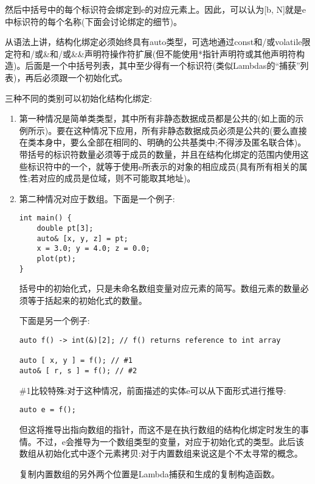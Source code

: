 然后中括号中的每个标识符会绑定到e的对应元素上。因此，可以认为[b, N]就是e中标识符的每个名称(下面会讨论绑定的细节)。

从语法上讲，结构化绑定必须始终具有auto类型，可选地通过const和/或volatile限定符和/或\&和/或\&\&声明符操作符扩展(但不能使用*指针声明符或其他声明符构造)。后面是一个中括号列表，其中至少得有一个标识符(类似Lambdas的“捕获”列表)，再后必须跟一个初始化式。

三种不同的类别可以初始化结构化绑定:

\begin{enumerate}
\item
第一种情况是简单类类型，其中所有非静态数据成员都是公共的(如上面的示例所示)。要在这种情况下应用，所有非静态数据成员必须是公共的(要么直接在类本身中，要么全部在相同的、明确的公共基类中;不得涉及匿名联合体)。带括号的标识符数量必须等于成员的数量，并且在结构化绑定的范围内使用这些标识符中的一个，就等于使用e所表示的对象的相应成员(具有所有相关的属性;若对应的成员是位域，则不可能取其地址)。

\item
第二种情况对应于数组。下面是一个例子:

\begin{lstlisting}[style=styleCXX]
int main() {
	double pt[3];
	auto& [x, y, z] = pt;
	x = 3.0; y = 4.0; z = 0.0;
	plot(pt);
}
\end{lstlisting}

括号中的初始化式，只是未命名数组变量对应元素的简写。数组元素的数量必须等于括起来的初始化式的数量。

下面是另一个例子:

\begin{lstlisting}[style=styleCXX]
auto f() -> int(&)[2]; // f() returns reference to int array

auto [ x, y ] = f(); // #1
auto& [ r, s ] = f(); // #2
\end{lstlisting}

\#1比较特殊:对于这种情况，前面描述的实体e可以从下面形式进行推导:

\begin{lstlisting}[style=styleCXX]
auto e = f();
\end{lstlisting}

但这将推导出指向数组的指针，而这不是在执行数组的结构化绑定时发生的事情。不过，e会推导为一个数组类型的变量，对应于初始化式的类型。此后该数组从初始化式中逐个元素拷贝:对于内置数组来说这是个不太寻常的概念。

\begin{tcolorbox}[colback=webgreen!5!white,colframe=webgreen!75!black]
\hspace*{0.75cm}复制内置数组的另外两个位置是Lambda捕获和生成的复制构造函数。
\end{tcolorbox}


\end{enumerate}
